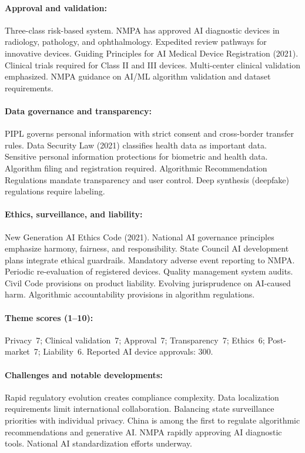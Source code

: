 {\paragraph{Approval and validation:}
Three-class risk-based system. NMPA has approved AI diagnostic devices in radiology, pathology, and ophthalmology. Expedited review pathways for innovative devices. Guiding Principles for AI Medical Device Registration (2021).
Clinical trials required for Class II and III devices. Multi-center clinical validation emphasized. NMPA guidance on AI/ML algorithm validation and dataset requirements.

\paragraph{Data governance and transparency:}
PIPL governs personal information with strict consent and cross-border transfer rules. Data Security Law (2021) classifies health data as important data. Sensitive personal information protections for biometric and health data.
Algorithm filing and registration required. Algorithmic Recommendation Regulations mandate transparency and user control. Deep synthesis (deepfake) regulations require labeling.

\paragraph{Ethics, surveillance, and liability:}
New Generation AI Ethics Code (2021). National AI governance principles emphasize harmony, fairness, and responsibility. State Council AI development plans integrate ethical guardrails.
Mandatory adverse event reporting to NMPA. Periodic re-evaluation of registered devices. Quality management system audits.
Civil Code provisions on product liability. Evolving jurisprudence on AI-caused harm. Algorithmic accountability provisions in algorithm regulations.

\paragraph{Theme scores (1--10):}
Privacy~7;
Clinical validation~7;
Approval~7;
Transparency~7;
Ethics~6;
Post-market~7;
Liability~6.
Reported AI device approvals: 300.

\paragraph{Challenges and notable developments:}
Rapid regulatory evolution creates compliance complexity. Data localization requirements limit international collaboration. Balancing state surveillance priorities with individual privacy.
China is among the first to regulate algorithmic recommendations and generative AI. NMPA rapidly approving AI diagnostic tools. National AI standardization efforts underway.


}
